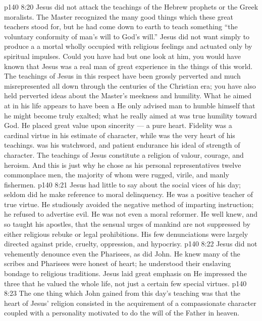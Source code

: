 \vs p140 8:20 Jesus did not attack the teachings of the Hebrew prophets or the Greek moralists. The Master recognized the many good things which these great teachers stood for, but he had come down to earth to teach something  “the voluntary conformity of man’s will to God’s will.” Jesus did not want simply to produce a  a mortal wholly occupied with religious feelings and actuated only by spiritual impulses. Could you have had but one look at him, you would have known that Jesus was a real man of great experience in the things of this world. The teachings of Jesus in this respect have been grossly perverted and much misrepresented all down through the centuries of the Christian era; you have also held perverted ideas about the Master’s meekness and humility. What he aimed at in his life appears to have been a  He only advised man to humble himself that he might become truly exalted; what he really aimed at was true humility toward God. He placed great value upon sincerity --- a pure heart. Fidelity was a cardinal virtue in his estimate of character, while  was the very heart of his teachings.  was his watchword, and patient endurance his ideal of strength of character. The teachings of Jesus constitute a religion of valour, courage, and heroism. And this is just why he chose as his personal representatives twelve commonplace men, the majority of whom were rugged, virile, and manly fishermen.
\vs p140 8:21 Jesus had little to say about the social vices of his day; seldom did he make reference to moral delinquency. He was a positive teacher of true virtue. He studiously avoided the negative method of imparting instruction; he refused to advertise evil. He was not even a moral reformer. He well knew, and so taught his apostles, that the sensual urges of mankind are not suppressed by either religious rebuke or legal prohibitions. His few denunciations were largely directed against pride, cruelty, oppression, and hypocrisy.
\vs p140 8:22 Jesus did not vehemently denounce even the Pharisees, as did John. He knew many of the scribes and Pharisees were honest of heart; he understood their enslaving bondage to religious traditions. Jesus laid great emphasis on  He impressed the three that he valued the whole life, not just a certain few special virtues.
\vs p140 8:23 \pc The one thing which John gained from this day’s teaching was that the heart of Jesus’ religion consisted in the acquirement of a compassionate character coupled with a personality motivated to do the will of the Father in heaven.
